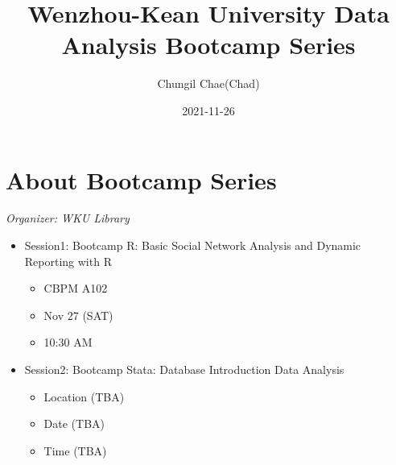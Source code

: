 \documentclass[
]{book}
\title{Wenzhou-Kean University Data Analysis Bootcamp Series}
\author{Chungil Chae(Chad)}
\date{2021-11-26}
\providecommand{\tightlist}{%
  \setlength{\itemsep}{0pt}\setlength{\parskip}{0pt}}
\begin{document}
\maketitle

{
\setcounter{tocdepth}{1}
\tableofcontents
}
\hypertarget{about-bootcamp-series}{%
\chapter{About Bootcamp Series}\label{about-bootcamp-series}}

\emph{Organizer: WKU Library}

\begin{itemize}
\tightlist
\item
  Session1: Bootcamp R: Basic Social Network Analysis and Dynamic Reporting with R

  \begin{itemize}
  \tightlist
  \item
    CBPM A102
  \item
    Nov 27 (SAT)
  \item
    10:30 AM
  \end{itemize}
\item
  Session2: Bootcamp Stata: Database Introduction Data Analysis

  \begin{itemize}
  \tightlist
  \item
    Location (TBA)
  \item
    Date (TBA)
  \item
    Time (TBA)
  \end{itemize}
\end{itemize}
\end{document}
